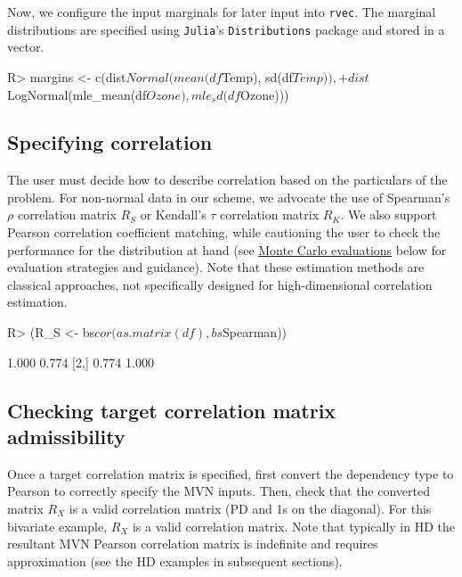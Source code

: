 \documentclass[
]{jss}
\begin{document}
Now, we configure the input marginals for later input into \texttt{rvec}. The marginal distributions are specified using \texttt{Julia}'s \texttt{Distributions} package and stored in a vector.

\begin{CodeChunk}
\begin{CodeInput}
R> margins <- c(dist$Normal(mean(df$Temp), sd(df$Temp)),
+              dist$LogNormal(mle_mean(df$Ozone), mle_sd(df$Ozone)))
\end{CodeInput}
\end{CodeChunk}

\hypertarget{specifying-correlation}{%
\subsection{Specifying correlation}\label{specifying-correlation}}

The user must decide how to describe correlation based on the particulars of the problem. For non-normal data in our scheme, we advocate the use of Spearman's \(\rho\) correlation matrix \(R_S\) or Kendall's \(\tau\) correlation matrix \(R_K\). We also support Pearson correlation coefficient matching, while cautioning the user to check the performance for the distribution at hand (see \protect\hyperlink{simulations}{Monte Carlo evaluations} below for evaluation strategies and guidance). Note that these estimation methods are classical approaches, not specifically designed for high-dimensional correlation estimation.

\begin{CodeChunk}
\begin{CodeInput}
R> (R_S <- bs$cor(as.matrix(df), bs$Spearman))
\end{CodeInput}
\begin{CodeOutput}
      [,1]  [,2]
[1,] 1.000 0.774
[2,] 0.774 1.000
\end{CodeOutput}
\end{CodeChunk}

\hypertarget{checking-target-correlation-matrix-admissibility}{%
\subsection{Checking target correlation matrix admissibility}\label{checking-target-correlation-matrix-admissibility}}

Once a target correlation matrix is specified, first convert the dependency type to Pearson to correctly specify the MVN inputs. Then, check that the converted matrix \(R_X\) is a valid correlation matrix (PD and 1s on the diagonal). For this bivariate example, \(R_X\) is a valid correlation matrix. Note that typically in HD the resultant MVN Pearson correlation matrix is indefinite and requires approximation (see the HD examples in subsequent sections).
\end{document}
